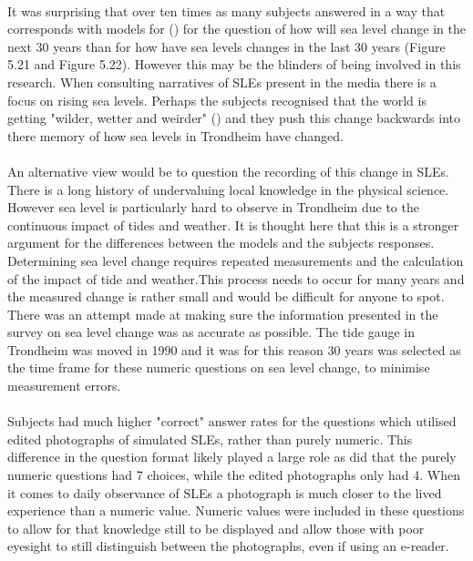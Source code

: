 \paragraph{}
It was surprising that over ten times as many subjects answered in a way that corresponds with models for (\cite{kartverket_se_2020}) for the question of how will sea level change in the next 30 years than for how have sea levels changes in the last 30 years (Figure 5.21 and Figure 5.22). However this may be the blinders of being involved in this research. When consulting narratives of SLEs present in the media there is a focus on rising sea levels. Perhaps the subjects recognised that the world is getting "wilder, wetter and weirder" (\cite{rod_integrated_2012}) and they push this change backwards into there memory of how sea levels in Trondheim have changed. 
\paragraph{}
An alternative view would be to question the recording of this change in SLEs. There is a long history of undervaluing local knowledge in the physical science. However sea level is particularly hard to observe in Trondheim due to the continuous impact of tides and weather. It is thought here that this is a stronger argument for the differences between the models and the subjects responses. Determining sea level change requires repeated measurements and the calculation of the impact of tide and weather.This process needs to occur for many years and the measured change is rather small and would be difficult for anyone to spot. There was an attempt made at making sure the information presented in the survey on sea level change was as accurate as possible. The tide gauge in Trondheim was moved in 1990 and it was for this reason 30 years was selected as the time frame for these numeric questions on sea level change, to minimise measurement errors. 

\paragraph{}
Subjects had much higher "correct" answer rates for the questions which utilised edited photographs of simulated SLEs, rather than purely numeric. This difference in the question format likely played a large role as did that the purely numeric questions had 7 choices, while the edited photographs only had 4. When it comes to daily observance of SLEs a photograph is much closer to the lived experience than a numeric value. Numeric values were included in these questions to allow for that knowledge still to be displayed and allow those with poor eyesight to still distinguish between the photographs, even if using an e-reader.
